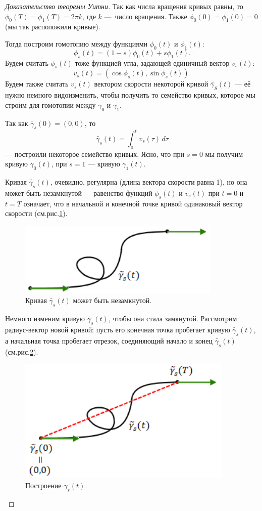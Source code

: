 \begin{proof}[Доказательство теоремы Уитни]
    Так как числа вращения кривых равны, то $\phi_0(T) = \phi_1(T) = 2\pi k$, где $k$ — число вращения. Также $\phi_0(0) = \phi_1(0) = 0$ (мы так расположили кривые).

    Тогда построим гомотопию между функциями $\phi_0(t)$ и $\phi_1(t)$:
    \[\phi_s(t) = (1-s) \phi_0(t) + s \phi_1(t).\]
    Будем считать $\phi_s(t)$ тоже функцией угла, задающей единичный вектор $v_s(t)$:
    \[v_s(t) = (\cos{\phi_s(t)}, \sin{\phi_s(t)}).\]
    Будем также считать $v_s(t)$ вектором скорости некоторой кривой $\tilde{\gamma_S}(t)$ — её нужно немного видоизменить, чтобы получить то семейство кривых, которое мы строим для гомотопии между $\gamma_0$ и $\gamma_1$.

    Так как $\tilde{\gamma_s}(0) = (0,0)$, то 
    \[\tilde{\gamma_s}(t) = \int_{0}^{t} v_s(\tau) \, d\tau\]
    — построили некоторое семейство кривых. Ясно, что при $s = 0$ мы получим кривую $\gamma_0(t)$, при $s = 1$ — кривую $\gamma_1(t)$.

    Кривая $\tilde{\gamma_s}(t)$, очевидно, регулярна (длина вектора скорости равна 1), но она может быть незамкнутой — равенство функций $\phi_s(t)$ и $v_s(t)$ при $t=0$ и $t=T$ означает, что в начальной и конечной точке кривой одинаковый вектор скорости (см.рис.\ref{fig:c13.2}).

    \begin{figure}[htbp]
        \centering
        \includegraphics[scale=0.7]{images/c13.2.png}
        \caption{Кривая $\tilde{\gamma_s}(t)$ может быть незамкнутой.}
        \label{fig:c13.2}
    \end{figure}

    Немного изменим кривую $\tilde{\gamma_s}(t)$, чтобы она стала замкнутой. Рассмотрим радиус-вектор новой кривой: пусть его конечная точка пробегает кривую $\tilde{\gamma_s}(t)$, а начальная точка пробегает отрезок, соединяющий начало и конец $\tilde{\gamma_s}(t)$ (см.рис.\ref{fig:c13.3}).

    \begin{figure}[htbp]
        \centering
        \includegraphics[scale=0.7]{images/c13.3.png}
        \caption{Построение $\gamma_s(t)$.}
        \label{fig:c13.3}
    \end{figure}


\end{proof}
